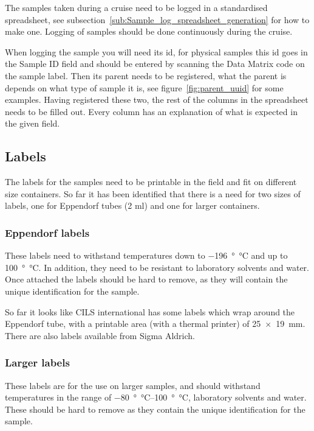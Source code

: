 \documentclass[a4paper,english, 11pt]{article}
\begin{document}
The samples taken during a cruise need to be logged in a standardised spreadsheet, see subsection~\ref{sub:Sample_log_spreadsheet_generation} for how to make one. Logging of samples should be done continuously during the cruise. 

When logging the sample you will need its id, for physical samples this id goes in the Sample ID field and should be entered by scanning the Data Matrix code on the sample label. Then its parent needs to be registered, what the parent is depends on what type of sample it is, see figure~\ref{fig:parent_uuid} for some examples. Having registered these two, the rest of the columns in the spreadsheet needs to be filled out. Every column has an explanation of what is expected in the given field. 


\subsection{Labels} %
\label{sub:Labels}

The labels for the samples need to be printable in the field and fit on different size containers. So far it has been identified that there is a need for two sizes of labels, one for Eppendorf tubes (2 ml) and one for larger containers.

\subsubsection{Eppendorf labels} %
\label{ssub:Eppendorf labels}

These labels need to withstand temperatures down to \SI{-196}{\degree\celsius} and up to \SI{100}{\degree\celsius}. In addition, they need to be resistant to laboratory solvents and water. Once attached the labels should be hard to remove, as they will contain the unique identification for the sample.

So far it looks like CILS international has some labels which wrap around the Eppendorf tube, with a printable area (with a thermal printer) of \SI{25x19}{\mm}. There are also labels available from Sigma Aldrich.



\subsubsection{Larger labels} %
\label{ssub:Larger labels}
These labels are for the use on larger samples, and should withstand temperatures in the range of \SIrange{-80}{100}{\degree\celsius}, laboratory solvents and water. These should be hard to remove as they contain the unique identification for the sample.
\end{document}

